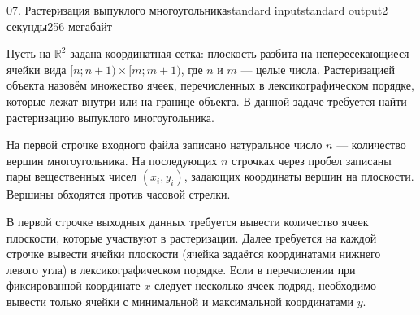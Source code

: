 \begin{problem}{07. Растеризация выпуклого многоугольника}{standard input}{standard output}{2 секунды}{256 мегабайт}

Пусть на $\mathbb R^2$ задана координатная сетка: плоскость разбита на непересекающиеся ячейки вида $[n; n + 1) \times [m; m + 1)$, где $n$ и $m$ --- целые числа. Растеризацией объекта назовём множество ячеек, перечисленных в лексикографическом порядке, которые лежат внутри или на границе объекта. В данной задаче требуется найти растеризацию выпуклого многоугольника.

\InputFile

На первой строчке входного файла записано натуральное число $n$ --- количество вершин многоугольника. На последующих $n$ строчках через пробел записаны пары вещественных чисел $(x_i, y_i)$, задающих координаты вершин на плоскости. Вершины обходятся против часовой стрелки.

\OutputFile

В первой строчке выходных данных требуется вывести количество ячеек плоскости, которые участвуют в растеризации. Далее требуется на каждой строчке вывести ячейки плоскости (ячейка задаётся координатами нижнего левого угла) в лексикографическом порядке. Если в перечислении при фиксированной координате $x$ следует несколько ячеек подряд, необходимо вывести только ячейки с минимальной и максимальной координатами $y$.

\Examples

\begin{example}%
%
\end{example}

\end{problem}
